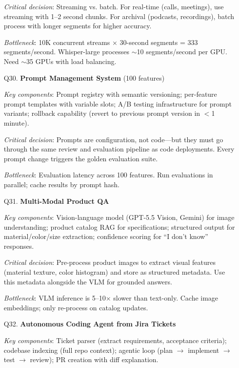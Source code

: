 \begin{enumerate}[leftmargin=*]
    \textit{Critical decision}: Streaming vs. batch. For real-time (calls, meetings), use streaming with 1--2 second chunks. For archival (podcasts, recordings), batch process with longer segments for higher accuracy.

    \textit{Bottleneck}: 10K concurrent streams $\times$ 30-second segments = 333 segments/second. Whisper-large processes $\sim$10 segments/second per GPU. Need $\sim$35 GPUs with load balancing.

    \item[Q30.] \textbf{Prompt Management System} (100 features)

    \textit{Key components}: Prompt registry with semantic versioning; per-feature prompt templates with variable slots; A/B testing infrastructure for prompt variants; rollback capability (revert to previous prompt version in $<$1 minute).

    \textit{Critical decision}: Prompts are configuration, not code---but they must go through the same review and evaluation pipeline as code deployments. Every prompt change triggers the golden evaluation suite.

    \textit{Bottleneck}: Evaluation latency across 100 features. Run evaluations in parallel; cache results by prompt hash.

    \item[Q31.] \textbf{Multi-Modal Product QA}

    \textit{Key components}: Vision-language model (GPT-5.5 Vision, Gemini) for image understanding; product catalog RAG for specifications; structured output for material/color/size extraction; confidence scoring for ``I don't know'' responses.

    \textit{Critical decision}: Pre-process product images to extract visual features (material texture, color histogram) and store as structured metadata. Use this metadata alongside the VLM for grounded answers.

    \textit{Bottleneck}: VLM inference is 5--10$\times$ slower than text-only. Cache image embeddings; only re-process on catalog updates.

    \item[Q32.] \textbf{Autonomous Coding Agent from Jira Tickets}

    \textit{Key components}: Ticket parser (extract requirements, acceptance criteria); codebase indexing (full repo context); agentic loop (plan $\to$ implement $\to$ test $\to$ review); PR creation with diff explanation.


\end{enumerate}
